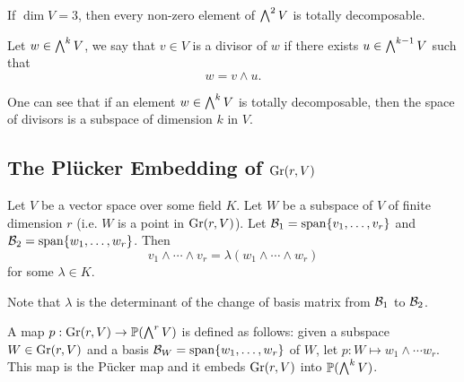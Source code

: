         \begin{example}
        \label{ex:totally-decomposible-2}
            If $\dim V = 3$,
            then every non-zero element of $\bigwedge^2 V$ is totally decomposable.
        \end{example}
        
        \begin{definition}[Divisor]
        \label{def:grassmannian-divisor}
            Let $w \in \bigwedge^k V$,
            we say that $v \in V$ is a divisor of $w$ if there exists $u \in \bigwedge^{k-1} V$ such that 
            \[
            w = v \wedge u. 
            \] 
        \end{definition}
        
        \begin{remark}
        \label{rem:space-of-divisors}
            One can see that if an element $w \in \bigwedge^k V$ is totally decomposable,
            then the space of divisors is a subspace of dimension $k$ in $V$.
        \end{remark}
        
    \subsection{The Pl\"{u}cker Embedding of $\operatorname{Gr}(r, V)$}
    \label{subsec:plucker-embedding-gr}
        \begin{lemma}
        \label{lem:plucker-embedding-lemma}
            Let $V$ be a vector space over some field $K$. 
            Let $W$ be a subspace of $V$ of finite dimension $r$ (i.e. $W$ is a point in $\operatorname{Gr}(r, V)$).
            Let $\mathcal{B}_1 = \operatorname{span}\{v_1, \ldots, v_r\}$
            and $\mathcal{B}_2 = \operatorname{span}\{w_1, \ldots, w_r\}$.
            Then 
            \[
            v_1 \wedge \cdots \wedge v_r = \lambda(w_1 \wedge \cdots \wedge w_r)
            \]
            for some $\lambda \in K$. 
        \end{lemma}
        Note that $\lambda$ is the determinant of the change of basis matrix from $\mathcal{B}_1$ to $\mathcal{B}_2$.
        
        \begin{definition}
        \label{def:plucker-embedding}
            A map $p: \operatorname{Gr}(r, V) \rightarrow \mathbb{P}(\bigwedge^r V)$ is defined as follows:
            given a subspace $W \in \operatorname{Gr}(r, V)$ 
            and a basis $\mathcal{B}_W = \operatorname{span}\{w_1, \ldots, w_r\}$ of $W$,
            let $p: W \mapsto w_1 \wedge \cdots w_r$. 
            This map is the P\"{u}cker map
            and it embeds $\operatorname{Gr}(r, V)$ into $\mathbb{P}(\bigwedge^k V)$. 
        \end{definition}
        
